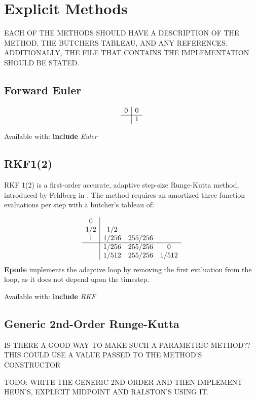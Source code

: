 \documentclass[letterpaper,10pt]{book}
\newcommand{\srcas}[1]{Available with: \textbf{include} \textlangle{}\textit{#1}\textrangle{}}
\newcommand{\epode}[0]{\textbf{Epode}}
\begin{document}
      
    \section{Explicit Methods}
    
      EACH OF THE METHODS SHOULD HAVE A DESCRIPTION OF THE METHOD, THE BUTCHERS TABLEAU, AND ANY REFERENCES.  ADDITIONALLY, THE FILE THAT CONTAINS THE IMPLEMENTATION SHOULD BE STATED.
      
      \subsection{Forward Euler}   
	\[
	  \begin{array}{c|c}
	    0 & 0\\
	    \hline
	    & 1
	  \end{array}
	\]
	
	\srcas{Euler}
	
      \subsection{RKF1(2)}
	RKF 1(2) is a first-order accurate, adaptive step-size Runge-Kutta method, introduced by Fehlberg in \cite{fehlberg1969low}.  The method requires an amortized three function evaluations per step with a butcher's tableau of:
	
	\[
	  \begin{array}{c|ccc}
	    0 & & &\\
	    1/2 & 1/2 & &\\
	    1 & 1/256 & 255/256 &\\	    
	    \hline
	    & 1/256 & 255/256 & 0\\
	    & 1/512 & 255/256 & 1/512\\
	  \end{array}
	\]    
	\epode{} implements the adaptive loop by removing the first evaluation from the loop, as it does not depend upon the timestep.
	
	\srcas{RKF}
    	
      \subsection{Generic 2nd-Order Runge-Kutta}
	IS THERE A GOOD WAY TO MAKE SUCH A PARAMETRIC METHOD?? THIS COULD USE A VALUE PASSED TO THE METHOD'S CONSTRUCTOR
	
	TODO: WRITE THE GENERIC 2ND ORDER AND THEN IMPLEMENT HEUN'S, EXPLICIT MIDPOINT AND RALSTON'S USING IT.
	
\end{document}
